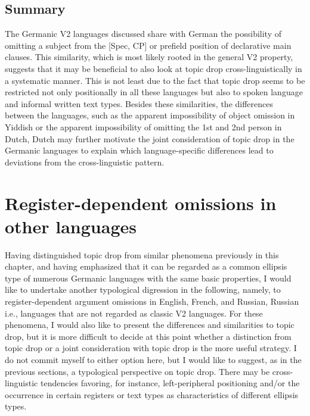 \subsection{Summary}
The Germanic V2 languages discussed share with German the possibility of omitting a subject from the [Spec, CP] or prefield position of declarative main clauses.
This similarity, which is most likely rooted in the general V2 property,  suggests that it may be beneficial to also look at topic drop cross\hyp linguistically in a systematic manner.
This is not least due to the fact that topic drop seems to be restricted not only positionally in all these languages but also to spoken language and informal written text types. 
Besides these similarities, the differences between the languages, such as the apparent impossibility of object omission in Yiddish or the apparent impossibility of omitting the 1st and 2nd person in Dutch, Dutch may further motivate the joint consideration of topic drop in the Germanic languages to explain which language-specific differences lead to deviations from the cross\hyp linguistic pattern.

\section{Register-dependent omissions in other languages}\label{sec:null.subjects.other.languages}   
Having distinguished topic drop from similar phenomena previously in this chapter, and having emphasized that it can be regarded as a common ellipsis type of numerous Germanic languages with the same basic properties, I would like to undertake another typological digression in the following, namely, to register-dependent argument omissions  in English, French, and Russian, Russian i.e., languages that are not regarded as classic V2 languages.
For these phenomena, I would also like to present the differences and similarities to topic drop, but it is more difficult to decide at this point whether a distinction from topic drop or a joint consideration with topic drop is the more useful strategy.
I do not commit myself to either option here, but I would like to suggest, as in the previous sections, a typological perspective on topic drop.
There may be cross\hyp linguistic tendencies favoring, for instance, left-peripheral positioning and/or the occurrence in certain registers or text types  as characteristics of different ellipsis types.

